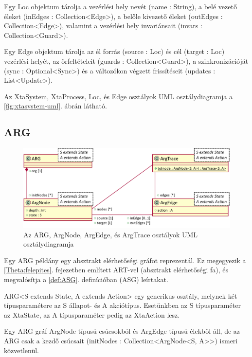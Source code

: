 Egy \textsf{Loc} objektum tárolja a vezérlési hely nevét (\textsf{name : String}), a belé vezető éleket (\textsf{inEdges : Collection<Edge>}), a belőle kivezető éleket (\textsf{outEdges : Collection<Edge>}), valamint a vezérlési hely invariánsait (\textsf{invars : Collection<Guard>}).

Egy \textsf{Edge} objektum tárolja az él forrás (\textsf{source : Loc}) és cél (\textsf{target : Loc}) vezérlési helyét, az őrfeltételeit (\textsf{guards : Collection<Guard>}), a szinkronizációját (\textsf{sync : Optional<Sync>}) és a változókon végzett frissítéseit (\textsf{updates : List<Update>}).

Az \textsf{XtaSystem}, \textsf{XtaProcess}, \textsf{Loc}, és \textsf{Edge} osztályok UML osztálydiagramja a \ref{fig:xtasystem-uml}. ábrán látható.

\subsection{ARG}
\begin{figure}%
    \centering
    \includegraphics[width=\textwidth, keepaspectratio]{src/figures/arg-uml.png}
    \caption{Az \textsf{ARG}, \textsf{ArgNode}, \textsf{ArgEdge}, és \textsf{ArgTrace} osztályok UML osztálydiagramja}
    \label{fig:arg-uml}
\end{figure}

Egy \textsf{ARG} példány egy absztrakt elérhetőségi gráfot reprezentál. Ez megegyezik a \ref{Theta:felepites}. fejezetben említett ART-vel (absztrakt elérhetőségi fa), és megvalósítja a \ref{def:ASG}. definícióban (ASG) leírtakat.

\textsf{ARG<S extends State, A extends Action>} egy generikus osztály, melynek két típusparamétere az \textsf{S} állapot- és \textsf{A} akciótípus. Esetünkben az \textsf{S} típusparaméter az \textsf{XtaState}, az \textsf{A} típusparaméter pedig az \textsf{XtaAction} lesz. 

Egy \textsf{ARG} gráf \textsf{ArgNode} típusú csúcsokból és \textsf{ArgEdge} típusú élekből áll, de az \textsf{ARG} csak a kezdő csúcsait (\textsf{initNodes : Collection<ArgNode<S, A>{}>}) ismeri közvetlenül.

